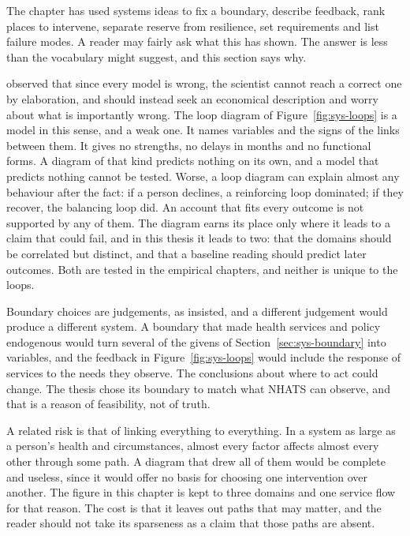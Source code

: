 The chapter has used systems ideas to fix a boundary, describe feedback, rank
places to intervene, separate reserve from resilience, set requirements and
list failure modes. A reader may fairly ask what this has shown. The answer
is less than the vocabulary might suggest, and this section says why.

\citet{box_1976} observed that since every model is wrong, the scientist
cannot reach a correct one by elaboration, and should instead seek an
economical description and worry about what is importantly wrong. The loop
diagram of Figure~\ref{fig:sys-loops} is a model in this sense, and a weak
one. It names variables and the signs of the links between them. It gives no
strengths, no delays in months and no functional forms. A diagram of that
kind predicts nothing on its own, and a model that predicts nothing cannot be
tested. Worse, a loop diagram can explain almost any behaviour after the
fact: if a person declines, a reinforcing loop dominated; if they recover, the
balancing loop did. An account that fits every outcome is not supported by any
of them. The diagram earns its place only where it leads to a claim that could
fail, and in this thesis it leads to two: that the domains should be
correlated but distinct, and that a baseline reading should predict later
outcomes. Both are tested in the empirical chapters, and neither is unique to
the loops.

Boundary choices are judgements, as \citet{checkland_1981} insisted, and a
different judgement would produce a different system. A boundary that made
health services and policy endogenous would turn several of the givens of
Section~\ref{sec:sys-boundary} into variables, and the feedback in
Figure~\ref{fig:sys-loops} would include the response of services to the
needs they observe. The conclusions about where to act could change. The
thesis chose its boundary to match what NHATS can observe, and that is a
reason of feasibility, not of truth.

A related risk is that of linking everything to everything. In a system as
large as a person's health and circumstances, almost every factor affects
almost every other through some path. A diagram that drew all of them would
be complete and useless, since it would offer no basis for choosing one
intervention over another. The figure in this chapter is kept to three domains
and one service flow for that reason. The cost is that it leaves out paths
that may matter, and the reader should not take its sparseness as a claim that
those paths are absent.

